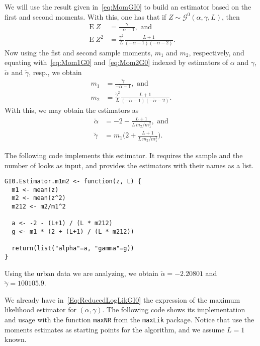 We will use the result given in~\eqref{eq:MomGI0} to build an estimator based on the first and second moments.
With this, one has that if $Z\sim\mathcal{G}^0(\alpha,\gamma,L)$, then
\begin{align}
\operatorname{E}Z	&= \frac{\gamma}{-\alpha-1}, \text{ and } \label{eq:Mom1G0} \\
\operatorname{E}Z^2	&= \frac{\gamma^2}{L}\frac{L+1}{(-\alpha-1)(-\alpha-2)}. \label{eq:Mom2G0}
\end{align}
Now using the fist and second sample moments, $m_1$ and $m_2$, respectively, and equating with~\eqref{eq:Mom1G0} and~\ref{eq:Mom2G0} indexed by estimators of $\alpha$ and $\gamma$, $\breve{\alpha}$ and $\breve{\gamma}$, resp., we obtain
\begin{align}
m_1	&= \frac{\breve\gamma}{-\breve\alpha-1}, \text{ and } \label{eq:SMom1G0} \\
m_2	&= \frac{\breve\gamma^2}{L}\frac{L+1}{(-\breve\alpha-1)(-\breve\alpha-2)}. \label{eq:SMom2G0}
\end{align}
With this, we may obtain the estimators as
\begin{align}
\breve{\alpha}	& = -2-\frac{L+1}{L\, m_2/m_1^2}, \text{ and} \label{Eq:EstMoma}\\
\breve\gamma		& = m_1 \Big(2+\frac{L+1}{L\, m_2/m_1^2}\Big).\label{Eq:EstMomb}
\end{align}

The following code implements this estimator.
It requires the sample and the number of looks as input,
and provides the estimators with their names as a list.

\begin{lstlisting}[frame=lines]
GI0.Estimator.m1m2 <- function(z, L) {
  m1 <- mean(z)
  m2 <- mean(z^2)
  m212 <- m2/m1^2
    
  a <- -2 - (L+1) / (L * m212)
  g <- m1 * (2 + (L+1) / (L * m212))
  
  return(list("alpha"=a, "gamma"=g))
}
\end{lstlisting}

Using the urban data we are analyzing, we obtain
$\breve{\alpha}=-2.20801$ and $\breve\gamma=100105.9$.

We already have in~\eqref{Eq:ReducedLogLikGI0} the expression of the maximum likelihood estimator for $(\alpha,\gamma)$.
The following code shows its implementation and usage with the function \verb|maxNR| from the \verb|maxLik| package\cite{maxLik}.
Notice that use the moments estimates as starting points for the algorithm, and we assume $L=1$ known.

